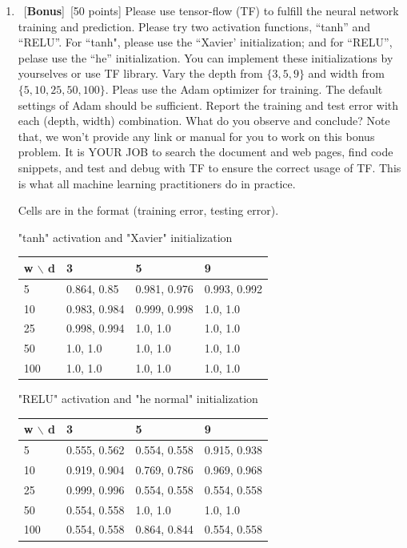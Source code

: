 \documentclass[12pt, fullpage,letterpaper]{article}
\begin{document}
\begin{enumerate}
\begin{enumerate}
	
	\item~[\textbf{Bonus}]~[50 points] Please use tensor-flow (TF) to fulfill the neural network training and prediction. Please try two activation functions, ``tanh'' and ``RELU''.  For ``tanh", please use the ``Xavier' initialization; and for ``RELU'', pelase use the ``he'' initialization. You can implement these initializations by yourselves or use TF library. 
	Vary the depth from $\{3, 5, 9\} $ and width from $\{5, 10, 25, 50, 100\}$. Pleas use the Adam optimizer for training. The default settings of Adam should be sufficient. 
	Report the training and test error with each (depth, width) combination. What do you observe and conclude? Note that, we won't provide any link or manual for you to work on this bonus problem. It is YOUR JOB to search the document and web pages, find  code snippets, and test and debug with TF to ensure the correct usage of  TF. This is what all machine learning practitioners do in practice. 
	
	\pagebreak
	
	Cells are in the format (training error, testing error).
	
	\bigbreak
	 
	"tanh" activation and "Xavier" initialization
	\begin{table}[h]
		\centering
		\begin{tabular}{l||lll}
			w $\backslash$ d & 3 & 5 & 9 \\
			\hline\hline
			5 & 0.864, 0.85 & 0.981, 0.976 & 0.993, 0.992 \\
			10 & 0.983, 0.984 & 0.999, 0.998 & 1.0, 1.0 \\
			25 & 0.998, 0.994 & 1.0, 1.0 & 1.0, 1.0 \\
			50 & 1.0, 1.0 & 1.0, 1.0 & 1.0, 1.0 \\
			100 & 1.0, 1.0 & 1.0, 1.0 & 1.0, 1.0 \\
		\end{tabular}
	\end{table}

	"RELU" activation and "he normal" initialization
	\begin{table}[h]
		\centering
		\begin{tabular}{l||lll}
			w $\backslash$ d & 3 & 5 & 9 \\
			\hline\hline
			5 & 0.555, 0.562 & 0.554, 0.558 & 0.915, 0.938 \\
			10 & 0.919, 0.904 & 0.769, 0.786 & 0.969, 0.968 \\
			25 & 0.999, 0.996 & 0.554, 0.558 & 0.554, 0.558 \\
			50 & 0.554, 0.558 & 1.0, 1.0 & 1.0, 1.0 \\
			100 & 0.554, 0.558 & 0.864, 0.844 & 0.554, 0.558 \\
		\end{tabular}
	\end{table}
	

\end{enumerate}
\end{enumerate}
\end{document}
